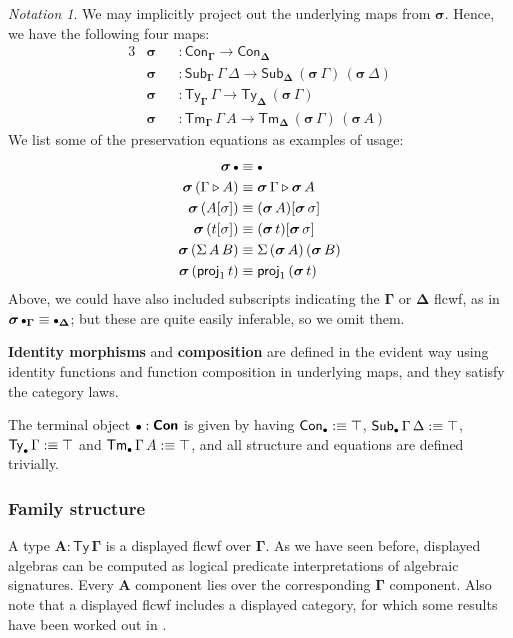\documentclass[12pt,a4paper,twoside,openany]{book}
\theoremstyle{remark}
\newtheorem{notation}{Notation}
\theoremstyle{definition}
\theoremstyle{theorem}
\newcommand{\bs}[1]{\boldsymbol{#1}}
\newcommand{\Con}{\mathsf{Con}}
\newcommand{\Sub}{\mathsf{Sub}}
\newcommand{\Tm}{\mathsf{Tm}}
\newcommand{\Ty}{\mathsf{Ty}}
\newcommand{\proj}{\mathsf{proj}}
\newcommand{\ext}{\triangleright}
\newcommand{\emptycon}{\scaleobj{.75}\bullet}
\newcommand{\bCon}{\bs{\Con}}
\newcommand{\bTy}{\bs{\Ty}}
\newcommand{\bGamma}{\bs{\Gamma}}
\newcommand{\bDelta}{\bs{\Delta}}
\newcommand{\bsigma}{\bs{\sigma}}
\newcommand{\bA}{\bs{A}}
\newcommand{\bemptycon}{\scaleobj{.75}{\bs{\bullet}}}
\newcommand{\defn}{:\equiv}
\begin{document}
\begin{notation}
We may implicitly project out the underlying maps from $\bsigma$. Hence, we
have the following four maps:
\begin{alignat*}{3}
  & \bsigma &&: \Con_{\bGamma} \to \Con_{\bDelta} \\
  & \bsigma &&: \Sub_{\bGamma}\,\Gamma\,\Delta \to \Sub_{\bDelta}\,(\bsigma\,\Gamma)\,(\bsigma\,\Delta)\\
  & \bsigma &&: \Ty_{\bGamma}\,\Gamma \to \Ty_{\bDelta}\,(\bsigma\,\Gamma)\\
  & \bsigma &&: \Tm_{\bGamma}\,\Gamma\,A \to \Tm_{\bDelta}\,(\bsigma\,\Gamma)\,(\bsigma\,A)
\end{alignat*}
We list some of the preservation equations as examples of usage:
\begin{alignat*}{3}
  \bsigma\,\emptycon &\equiv \emptycon \\
  \bsigma\,(\Gamma \ext A) &\equiv \bsigma\,\Gamma \ext \bsigma\,A\\
  \bsigma\,(A[\sigma]) &\equiv (\bsigma\,A)[\bsigma\,\sigma]\\
  \bsigma\,(t[\sigma]) &\equiv (\bsigma\,t)[\bsigma\,\sigma]\\
  \bsigma\,(\Sigma\,A\,B) &\equiv \Sigma\,(\bsigma\,A)\,(\bsigma\,B)\\
  \bsigma\,(\proj_1\,t) &\equiv \proj_1\,(\bsigma\,t)
\end{alignat*}
Above, we could have also included subscripts indicating the $\bGamma$ or
$\bDelta$ flcwf, as in $\bsigma\,\emptycon_{\bGamma} \equiv
\emptycon_{\bDelta}$; but these are quite easily inferable, so we omit them.
\end{notation}

\textbf{Identity morphisms} and \textbf{composition} are defined in the evident
way using identity functions and function composition in underlying maps, and
they satisfy the category laws.

The terminal object $\bemptycon:\bCon$ is given by having $\Con_{\bemptycon} \defn
\top$, $\Sub_{\bemptycon}\,\Gamma\,\Delta \defn \top$, $\Ty_{\bemptycon}\,\Gamma \defn \top$ and
$\Tm_{\bemptycon}\,\Gamma\,A \defn \top$, and all structure and equations are defined trivially.

\subsubsection{Family structure}
\label{sec:fqiit-family}

A type $\bA : \bTy\,\bGamma$ is a displayed flcwf over $\bGamma$.  As we have
seen before, displayed algebras can be computed as logical predicate
interpretations of algebraic signatures. Every $\bA$ component lies over the
corresponding $\bGamma$ component. Also note that a displayed flcwf includes a
displayed category, for which some results have been worked out in
\cite{displayedcats}.
\end{document}
